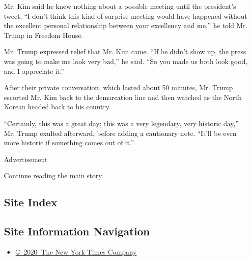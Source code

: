 Mr. Kim said he knew nothing about a possible meeting until the
president's tweet. ``I don't think this kind of surprise meeting would
have happened without the excellent personal relationship between your
excellency and me,'' he told Mr. Trump in Freedom House.

Mr. Trump expressed relief that Mr. Kim came. ``If he didn't show up,
the press was going to make me look very bad,'' he said. ``So you made
us both look good, and I appreciate it.''

After their private conversation, which lasted about 50 minutes, Mr.
Trump escorted Mr. Kim back to the demarcation line and then watched as
the North Korean headed back to his country.

``Certainly, this was a great day; this was a very legendary, very
historic day,'' Mr. Trump exulted afterward, before adding a cautionary
note. ``It'll be even more historic if something comes out of it.''

Advertisement

\protect\hyperlink{after-bottom}{Continue reading the main story}

\hypertarget{site-index}{%
\subsection{Site Index}\label{site-index}}

\hypertarget{site-information-navigation}{%
\subsection{Site Information
Navigation}\label{site-information-navigation}}

\begin{itemize}
\tightlist
\item
  \href{https://help.nytimes3xbfgragh.onion/hc/en-us/articles/115014792127-Copyright-notice}{©~2020~The
  New York Times Company}
\end{itemize}

